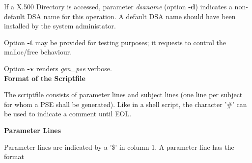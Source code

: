 If a X.500 Directory is accessed, parameter {\em dsaname} (option {\bf -d}) 
indicates a non-default DSA name for this operation. 
A default DSA name should have been installed by the system administator.

Option {\bf -t} may be provided for testing purposes; it requests to control the malloc/free behaviour.

Option {\bf -v} renders {\em gen\_pse} verbose.
\\ [0.5cm]
{\large\bf Format of the Scriptfile}

The scriptfile consists of parameter lines and subject lines (one line per subject
for whom a PSE shall be generated).
Like in a shell script, the character '\#' can be used to indicate a comment until EOL.

{\bf Parameter Lines}

Parameter lines are indicated by a '\$' in column 1.
A parameter line has the format

